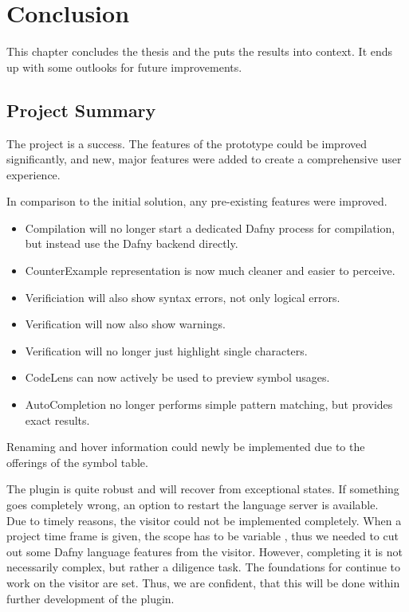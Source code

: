 \section{Conclusion}
\label{section:conclusion}
This chapter concludes the thesis and the puts the results into context.
It ends up with some outlooks for future improvements.

\subsection{Project Summary}
The project is a success.
The features of the prototype could be improved significantly, and new, major features were added to create a comprehensive user experience.

In comparison to the initial solution, any pre-existing features were improved.
\begin{itemize}
 \item Compilation will no longer start a dedicated Dafny process for compilation, but instead use the Dafny backend directly.
 \item CounterExample representation is now much cleaner and easier to perceive.
 \item Verificiation will also show syntax errors, not only logical errors.
 \item Verification will now also show warnings.
 \item Verification will no longer just highlight single characters.
 \item CodeLens can now actively be used to preview symbol usages.
 \item AutoCompletion no longer performs simple pattern matching, but provides exact results.
\end{itemize}
Renaming and hover information could newly be implemented due to the offerings of the symbol table.

The plugin is quite robust and will recover from exceptional states.
If something goes completely wrong, an option to restart the language server is available.\\

Due to timely reasons, the visitor could not be implemented completely.
When a project time frame is given, the scope has to be variable \cite{keller},
thus we needed to cut out some Dafny language features from the visitor.
However, completing it is not necessarily complex, but rather a diligence task.
The foundations for continue to work on the visitor are set.
Thus, we are confident, that this will be done within further development of the plugin.\\

